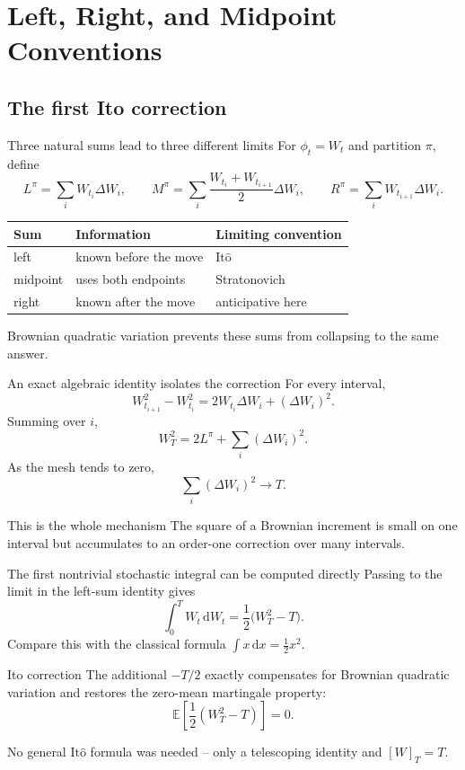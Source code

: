 \documentclass[10pt,aspectratio=169]{beamer}
\newcommand{\E}{\mathbb E}
\newcommand{\dd}{\,\mathrm d}
\newcommand{\Ito}{\mathrm{It\hat{o}}}
\begin{document}
\section{Left, Right, and Midpoint Conventions}
\subsection{The first Ito correction}

\begin{frame}{Three natural sums lead to three different limits}
For \(\phi_t=W_t\) and partition \(\pi\), define
\[
L^\pi=\sum_iW_{t_i}\Delta W_i,
\qquad
M^\pi=\sum_i\frac{W_{t_i}+W_{t_{i+1}}}{2}\Delta W_i,
\qquad
R^\pi=\sum_iW_{t_{i+1}}\Delta W_i.
\]
\begin{center}
\begin{tabular}{lll}
\toprule
Sum & Information & Limiting convention \\
\midrule
left & known before the move & \(\Ito\) \\
midpoint & uses both endpoints & Stratonovich \\
right & known after the move & anticipative here \\
\bottomrule
\end{tabular}
\end{center}
Brownian quadratic variation prevents these sums from collapsing to the same answer.
\end{frame}

\begin{frame}{An exact algebraic identity isolates the correction}
For every interval,
\[
W_{t_{i+1}}^2-W_{t_i}^2
=2W_{t_i}\Delta W_i+(\Delta W_i)^2.
\]
Summing over \(i\),
\[
W_T^2
=2L^\pi+\sum_i(\Delta W_i)^2.
\]
As the mesh tends to zero,
\[
\sum_i(\Delta W_i)^2\longrightarrow T.
\]
\begin{block}{This is the whole mechanism}
The square of a Brownian increment is small on one interval but accumulates to an order-one correction over many intervals.
\end{block}
\end{frame}

\begin{frame}{The first nontrivial stochastic integral can be computed directly}
Passing to the limit in the left-sum identity gives
\[
\boxed{
\int_0^T W_t\dd W_t
=\frac12\bigl(W_T^2-T\bigr).}
\]
Compare this with the classical formula \(\int x\dd x=\frac12x^2\).
\begin{block}{Ito correction}
The additional \(-T/2\) exactly compensates for Brownian quadratic variation and restores the zero-mean martingale property:
\[
\E\left[\frac12(W_T^2-T)\right]=0.
\]
\end{block}
No general \(\Ito\) formula was needed -- only a telescoping identity and \([W]_T=T\).
\end{frame}
\end{document}
